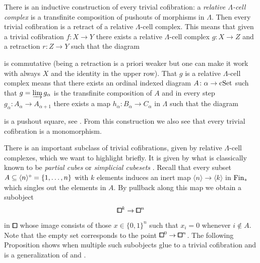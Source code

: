 \begin{construction}\label{cons:triv-cofib}
There is an inductive construction of every trivial cofibration:
a \emph{relative $\Lambda$-cell complex} is a transfinite composition of pushouts of morphisms in $\Lambda$.
Then every trivial cofibration is a retract of a relative $\Lambda$-cell complex.
This means that given a trivial cofibration $f\colon X\to Y$ there exists
a relative $\Lambda$-cell complex $g\colon X\to Z$ and a retraction $r\colon Z\to Y$ such that the diagram
\begin{center}
\end{center}
is commutative (being a retraction is a priori weaker but one can make it work with always $X$ and the identity in the upper row).
That $g$ is a relative $\Lambda$-cell complex means that there exists an ordinal indexed diagram
$A\colon\alpha\to\mathrm{cSet}$ such that $g = \varinjlim g_\alpha$ is the transfinite composition of $A$
and in every step $g_\alpha\colon A_\alpha\to A_{\alpha+1}$ there exists a map
$h_\alpha\colon B_\alpha\to C_\alpha$ in $\Lambda$ such that the diagram
\begin{center}
\end{center}
is a pushout square,
see \cite[Definition 2.1.9, Corollary 2.1.15]{Hovey2007}.
From this construction we also see that every trivial cofibration is a monomorphism.
\end{construction}

There is an important subclass of trivial cofibrations,
given by relative $\Lambda$-cell complexes, which we want to highlight briefly.
It is given by what is classically known to be \emph{partial cubes} \cite[Lemma 7.5]{Gutman2020} or \emph{simplicial cubesets} \cite[Definition 3.1.4]{Candela2017}.
Recall that every subset $A\subseteq\langle n\rangle^\circ=\{1,\dots, n\}$ with $k$ elements induces an inert map
$\langle n\rangle\to\langle k\rangle$ in $\mathrm{Fin}_\ast$ which singles out the elements in $A$.
By pullback along this map we obtain a subobject
\[
    {\bbox}^k\to{\bbox}^n
\]
in $\bbox$ whose image consists of those $x\in\{0,1\}^n$ such that $x_i = 0$ whenever $i\not\in A$.
Note that the empty set corresponds to the point ${\bbox}^0\to{\bbox}^n$.
The following Proposition shows when multiple such subobjects glue to a trivial cofibration
and is a generalization of \cite[Lemma 3.1.5]{Candela2017} and \cite[Lemma 7.5]{Gutman2020}.

